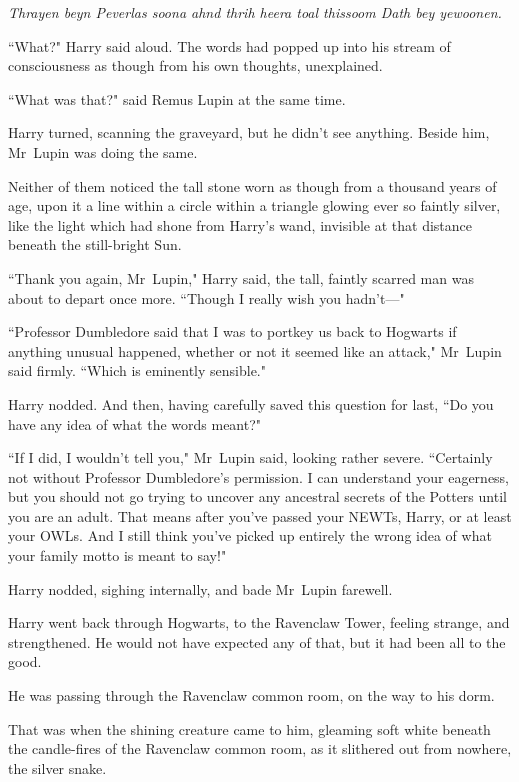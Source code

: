 \emph{Thrayen beyn Peverlas soona ahnd thrih heera toal thissoom Dath bey yewoonen.}

``What?" Harry said aloud. The words had popped up into his stream of consciousness as though from his own thoughts, unexplained.

``What was that?" said Remus Lupin at the same time.

Harry turned, scanning the graveyard, but he didn't see anything. Beside him, Mr~Lupin was doing the same.

Neither of them noticed the tall stone worn as though from a thousand years of age, upon it a line within a circle within a triangle glowing ever so faintly silver, like the light which had shone from Harry's wand, invisible at that distance beneath the still-bright Sun.


``Thank you again, Mr~Lupin," Harry said, the tall, faintly scarred man was about to depart once more. ``Though I really wish you hadn't—"

``Professor Dumbledore said that I was to portkey us back to Hogwarts if anything unusual happened, whether or not it seemed like an attack," Mr~Lupin said firmly. ``Which is eminently sensible."

Harry nodded. And then, having carefully saved this question for last, ``Do you have any idea of what the words meant?"

``If I did, I wouldn't tell you," Mr~Lupin said, looking rather severe. ``Certainly not without Professor Dumbledore's permission. I can understand your eagerness, but you should not go trying to uncover any ancestral secrets of the Potters until you are an adult. That means after you've passed your NEWTs, Harry, or at least your OWLs. And I still think you've picked up entirely the wrong idea of what your family motto is meant to say!"

Harry nodded, sighing internally, and bade Mr~Lupin farewell.

\later

Harry went back through Hogwarts, to the Ravenclaw Tower, feeling strange, and strengthened. He would not have expected any of that, but it had been all to the good.

He was passing through the Ravenclaw common room, on the way to his dorm.

That was when the shining creature came to him, gleaming soft white beneath the candle-fires of the Ravenclaw common room, as it slithered out from nowhere, the silver snake.

